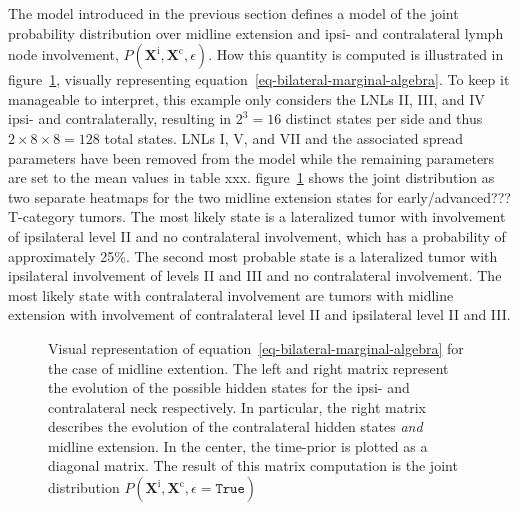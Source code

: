 \documentclass[
  sn-mathphys-num,
]{sn-jnl}
\begin{document}
The model introduced in the previous section defines a model of the
joint probability distribution over midline extension and ipsi- and
contralateral lymph node involvement,
\(P \left( \mathbf{X}^\text{i}, \mathbf{X}^\text{c}, \epsilon \right)\).
How this quantity is computed is illustrated in
figure~\ref{fig-model-state-dist}, visually representing
equation~\ref{eq-bilateral-marginal-algebra}. To keep it manageable to
interpret, this example only considers the LNLs II, III, and IV ipsi-
and contralaterally, resulting in \(2^3 = 16\) distinct states per side
and thus \(2 \times 8 \times 8 = 128\) total states. LNLs I, V, and VII
and the associated spread parameters have been removed from the model
while the remaining parameters are set to the mean values in table xxx.
figure~\ref{fig-model-state-dist} shows the joint distribution as two
separate heatmaps for the two midline extension states for
early/advanced??? T-category tumors. The most likely state is a
lateralized tumor with involvement of ipsilateral level II and no
contralateral involvement, which has a probability of approximately
25\%. The second most probable state is a lateralized tumor with
ipsilateral involvement of levels II and III and no contralateral
involvement. The most likely state with contralateral involvement are
tumors with midline extension with involvement of contralateral level II
and ipsilateral level II and III.

\begin{figure}


\caption{\label{fig-model-state-dist}Visual representation of
equation~\ref{eq-bilateral-marginal-algebra} for the case of midline
extention. The left and right matrix represent the evolution of the
possible hidden states for the ipsi- and contralateral neck
respectively. In particular, the right matrix describes the evolution of
the contralateral hidden states \emph{and} midline extension. In the
center, the time-prior is plotted as a diagonal matrix. The result of
this matrix computation is the joint distribution
\(P \left( \mathbf{X}^\text{i}, \mathbf{X}^\text{c}, \epsilon=\texttt{True} \right)\)}

\end{figure}%
\end{document}
